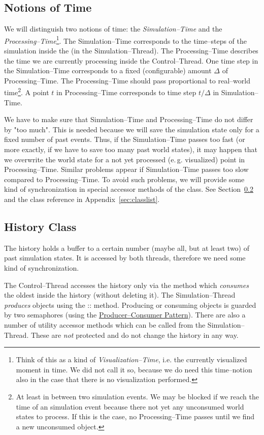 \subsection{Notions of Time}
We will distinguish two notions of time: the \emph{Simulation--Time} and the \emph{Processing--Time}\footnote{Think of this as a kind of \emph{Visualization--Time}, i.e. the currently visualized moment in time. We did not call it so, because we do need this time--notion also in the case that there is no visualization performed.}. The Simulation--Time corresponds to the time--steps of the simulation inside the  (in the Simulation--Thread). The Processing--Time describes the time we are currently processing inside the Control--Thread. One time step in the Simulation--Time corresponds to a fixed (configurable) amount $\Delta$ of Processing--Time. The Processing--Time should pass proportional to real--world time\footnote{At least in between two simulation events. We may be blocked if we reach the time of an simulation event because there not yet any unconsumed world states to process. If this is the case, no Processing--Time passes until we find a new unconsumed  object.}. A point $t$ in Processing--Time corresponds to time step $t/\Delta$ in Simulation--Time.\smallskip

\noindent
We have to make sure that Simulation--Time and Processing--Time do not differ by "too much". This is needed because we will save the simulation state only for a fixed number of past events. Thus, if the Simulation--Time passes too fast (or more exactly, if we have to save too many past world states), it may happen that we overwrite the world state for a not yet processed (e.\,g. visualized) point in Processing--Time. Similar problems appear if Simulation--Time passes too slow compared to Processing--Time. To avoid such problems, we will provide some kind of synchronization in special accessor methods of the  class. See Section~\ref{sec:history_class} and the class reference in Appendix~\ref{sec:classlist}.

\subsection{History Class}\label{sec:history_class}
The history holds a buffer to a certain number (maybe all, but at least two) of past simulation states. It is accessed by both threads, therefore we need some kind of synchronization.\smallskip

\noindent
The Control--Thread accesses the history only via the  method which \emph{consumes} the oldest  inside the history (without deleting it). The Simulation--Thread \emph{produces}  objects using the :: method. Producing or consuming  objects is guarded by two semaphores (using the \href{http://en.wikipedia.org/wiki/Producer-consumer_problem}{Producer--Consumer Pattern}). There are also a number of utility accessor methods which can be called from the Simulation--Thread. These are \emph{not} protected and do not change the history in any way.

